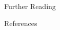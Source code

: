 \documentclass{beamer}
\begin{document}
  \begin{frame}[allowframebreaks]{Further Reading}
    \tiny
  \end{frame}

  \begin{frame}[allowframebreaks]{References}
    \tiny
    \printbibliography[heading=none]
  \end{frame}
\end{document}
